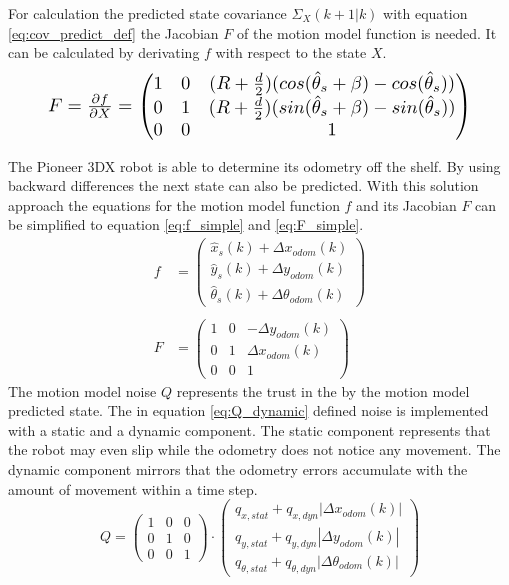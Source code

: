 For calculation the predicted state covariance $\Sigma_{X}(k+1|k)$ with equation \eqref{eq:cov_predict_def} the Jacobian $F$ of the motion model function is needed. It can be calculated by derivating $f$ with respect to the state $X$.
\begin{equation}\label{eq:MotionModel}
    \resizebox{0.88\hsize}{!}{%
        $F = \frac{\partial f}{\partial X} = \begin{pmatrix} 1 & 0 & (R+{\frac{d}{2}})(cos(\hat{\theta}_s+ \beta)-cos(\hat{\theta}_s)) \\ 0 & 1 & (R+\frac{d}{2})(sin(\hat{\theta}_s+ \beta)-sin(\hat{\theta}_s)) \\ 0 & 0 & 1\end{pmatrix}$%
        }
\end{equation}

The Pioneer 3DX robot is able to determine its odometry off the shelf. By using backward differences the next state can also be predicted. With this solution approach the equations for the motion model function $f$ and its Jacobian $F$ can be simplified to equation \eqref{eq:f_simple} and \eqref{eq:F_simple}. 
\begin{align}
f &= \begin{pmatrix} \hat{x}_s(k) + \Delta x_{odom}(k) \\ \hat{y}_s(k) + \Delta y_{odom}(k) \\ \hat{\theta}_s(k) + \Delta \theta_{odom}(k)\end{pmatrix}
\label{eq:f_simple} \\ \nonumber \\
F &= \begin{pmatrix} 1 & 0 & - \Delta y_{odom}(k) \\ 0 & 1 & \Delta x_{odom}(k) \\ 0 & 0 & 1\end{pmatrix} \label{eq:F_simple}
\end{align}
The motion model noise $Q$ represents the trust in the by the motion model predicted state. The in equation \eqref{eq:Q_dynamic} defined noise is implemented with a static and a dynamic component. The static component represents that the robot may even slip while the odometry does not notice any movement. The dynamic component mirrors that the odometry errors accumulate with the amount of movement within a time step.
\begin{equation}
Q = \begin{pmatrix} 1 & 0 & 0 \\ 0 & 1 & 0 \\ 0 & 0 & 1\end{pmatrix} \cdot \begin{pmatrix} q_{x,stat} + q_{x,dyn} |\Delta x_{odom}(k)| \\ q_{y,stat} + q_{y,dyn} |\Delta y_{odom}(k)|  \\ q_{\theta,stat} + q_{\theta,dyn} |\Delta \theta_{odom}(k)| \end{pmatrix}
\label{eq:Q_dynamic}
\end{equation}

